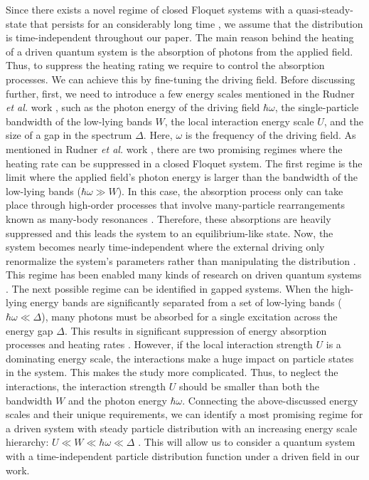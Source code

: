 \documentclass{article}
\begin{document}
Since there exists a novel regime of closed Floquet systems with a quasi-steady-state that persists for an considerably long time \cite{lindner2017}, we assume that the distribution is time-independent throughout our paper. The main reason behind the heating of a driven quantum system is the absorption of photons from the applied field. Thus, to suppress the heating rating we require to control the absorption processes. We can achieve this by fine-tuning the driving field. Before discussing further, first, we need to introduce a few energy scales mentioned in the Rudner \textit{et al.} work \cite{rudner2020}, such as the photon energy of the driving field $\hbar\omega$, the single-particle bandwidth of the low-lying bands $W$, the local interaction energy scale $U$, and the size of a gap in the spectrum $\Delta$.  Here, $\omega$ is the frequency of the driving field.
As mentioned in Rudner \textit{et al.} work \cite{rudner2020}, there are two promising regimes where the heating rate can be suppressed in a closed Floquet system. The first regime is the limit where the applied field's photon energy is larger than the bandwidth of the low-lying bands ($\hbar\omega \gg W$). In this case, the absorption process only can take place through high-order processes that involve many-particle rearrangements known as many-body resonances  \cite{bukov2016,lindner2017,rudner2020}. Therefore, these absorptions are heavily suppressed and this leads the system to an equilibrium-like
state. Now, the system becomes nearly time-independent where the external driving only renormalize the system's parameters rather than manipulating the distribution \cite{wackerlthesis20}.
This regime has been enabled many kinds of research on driven quantum systems \cite{kitagawa2011,lopez2015,pervishko2015,bukov2015,yudin2016}.
The next possible regime can be identified in gapped systems. When the high-lying energy bands are significantly separated from a set of low-lying bands ($\hbar\omega \ll \Delta$), many photons must be absorbed for a single excitation across the energy gap $\Delta$. This results in significant suppression of energy absorption processes and heating rates \cite{rudner2020}. However, if the local interaction strength $U$ is a dominating energy scale, the interactions make a huge impact on particle states in the system. This makes the study more complicated. Thus, to neglect the interactions, the interaction strength $U$ should be smaller than both the bandwidth $W$ and the photon energy $\hbar\omega$. Connecting the above-discussed energy scales and their unique requirements, we can identify a most promising regime for a driven system with steady particle distribution with an increasing energy scale hierarchy: $U \ll W \ll \hbar\omega \ll \Delta$ \cite{rudner2020,wackerlthesis20}. This will allow us to consider a quantum system with a time-independent particle distribution function under a driven field in our work.
\end{document}
